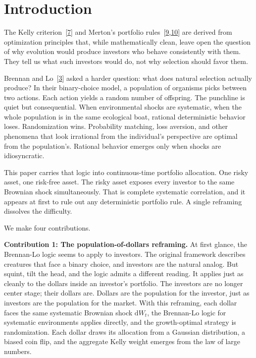 \documentclass[11pt]{article}
\newcommand{\dd}{\mathrm{d}}
\begin{document}
\newpage
\section{Introduction}

The Kelly criterion~[\hyperlink{ref:7}{7}] and Merton's portfolio rules~[\hyperlink{ref:9}{9},\hyperlink{ref:10}{10}] are
derived from optimization principles that, while mathematically
clean, leave open the question of why evolution would produce
investors who behave consistently with them. They tell us what such
investors would do, not why selection should favor them.

Brennan and Lo~[\hyperlink{ref:3}{3}] asked a harder question: what does natural
selection actually produce? In their binary-choice model, a population
of organisms picks between two actions. Each action yields a random
number of offspring. The punchline is quiet but consequential. When
environmental shocks are systematic, when the whole population is in the same ecological boat, rational deterministic behavior loses.
Randomization wins. Probability matching, loss aversion, and other
phenomena that look irrational from the individual's perspective are
optimal from the population's. Rational behavior emerges only when
shocks are idiosyncratic.

This paper carries that logic into continuous-time portfolio
allocation. One risky asset, one risk-free asset. The risky asset
exposes every investor to the same Brownian shock simultaneously.
That is complete systematic correlation, and it appears at first to
rule out any deterministic portfolio rule. A single reframing
dissolves the difficulty.

We make four contributions.

\textbf{Contribution 1: The population-of-dollars reframing.}
At first glance, the Brennan-Lo logic seems to apply to investors.
The original framework describes creatures that face a binary choice,
and investors are the natural analog. But squint, tilt the head, and
the logic admits a different reading. It applies just as cleanly to
the dollars inside an investor's portfolio. The investors are no
longer center stage; their dollars are. Dollars are the population
for the investor, just as investors are the population for the
market. With this reframing, each dollar faces the same systematic
Brownian shock $\dd W_{t}$, the Brennan-Lo logic for systematic
environments applies directly, and the growth-optimal strategy is
randomization. Each dollar draws its allocation from a Gaussian
distribution, a biased coin flip, and the aggregate Kelly weight
emerges from the law of large numbers.
\end{document}
